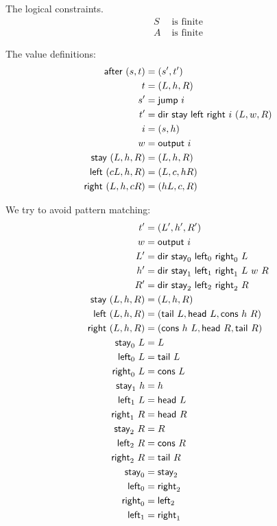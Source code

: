 The logical constraints.
\begin{align}
    S &\text{ is finite}
    \\
    A &\text{ is finite}
\end{align}

The value definitions:
\begin{align}
    \textsf{after}~(s,t) &= (s',t')
    \\
    t &= (L,h,R)
    \\
    s' &= \textsf{jump}~i
    \\
    t' &= \textsf{dir}~\textsf{stay}~\textsf{left}~\textsf{right}~i~(L,w,R)
    \\
    i &= (s,h)
    \\
    w &= \textsf{output}~i
    \\
    \textsf{stay}~(L,h,R) &= (L,h,R)
    \\
    \textsf{left}~(cL,h,R) &= (L,c,hR)
    \\
    \textsf{right}~(L,h,cR) &= (hL,c,R)
\end{align}

We try to avoid pattern matching:
\begin{align}
    t' &= (L',h',R')
    \\
    w &= \textsf{output}~i
    \\
    L' &= \textsf{dir}~\textsf{stay}_0~\textsf{left}_0~\textsf{right}_0~L
    \\
    h' &= \textsf{dir}~\textsf{stay}_1~\textsf{left}_1~\textsf{right}_1~L~w~R
    \\
    R' &= \textsf{dir}~\textsf{stay}_2~\textsf{left}_2~\textsf{right}_2~R
    \\
    \textsf{stay}~(L,h,R) &= (L,h,R)
    \\
    \textsf{left}~(L,h,R) &= (\textsf{tail}~L, \textsf{head}~L, \textsf{cons}~h~R)
    \\
    \textsf{right}~(L,h,R) &= (\textsf{cons}~h~L, \textsf{head}~R, \textsf{tail}~R)
    \\
    \textsf{stay}_0~L &= L
    \\
    \textsf{left}_0~L &= \textsf{tail}~L
    \\
    \textsf{right}_0~L &= \textsf{cons}~L
    \\
    \textsf{stay}_1~h &= h
    \\
    \textsf{left}_1~L &= \textsf{head}~L
    \\
    \textsf{right}_1~R &= \textsf{head}~R
    \\
    \textsf{stay}_2~R &= R
    \\
    \textsf{left}_2~R &= \textsf{cons}~R
    \\
    \textsf{right}_2~R &= \textsf{tail}~R
    \\
    \textsf{stay}_0 &= \textsf{stay}_2
    \\
    \textsf{left}_0 &= \textsf{right}_2
    \\
    \textsf{right}_0 &= \textsf{left}_2
    \\
    \textsf{left}_1 &= \textsf{right}_1
\end{align}

